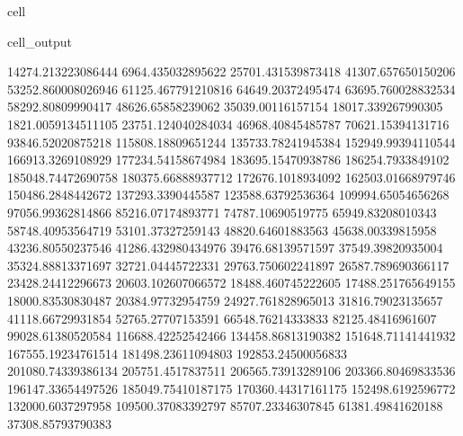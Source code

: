 \documentclass[letterpaper,10pt,english]{jupyterBook}
\begin{document}
\begin{sphinxuseclass}{cell}
\begin{sphinxVerbatimOutput}
\begin{sphinxuseclass}{cell_output}
\begin{sphinxVerbatim}[commandchars=\\\{\}]
14274.213223086444  \PYGZhy{}6964.435032895622  \PYGZhy{}25701.431539873418  \PYGZhy{}41307.657650150206  \PYGZhy{}53252.860008026946  \PYGZhy{}61125.467791210816  \PYGZhy{}64649.20372495474  \PYGZhy{}63695.760028832534  \PYGZhy{}58292.80809990417  \PYGZhy{}48626.65858239062  \PYGZhy{}35039.00116157154  \PYGZhy{}18017.339267990305  1821.0059134511105  23751.124040284034  46968.40845485787  70621.15394131716  93846.52020875218  115808.18809651244  135733.78241945384  152949.99394110544  166913.3269108929  177234.54158674984  183695.15470938786  186254.7933849102  185048.74472690758  180375.66888937712  172676.1018934092  162503.01668979746  150486.2848442672  137293.3390445587  123588.63792536364  109994.65054656268  97056.99362814866  85216.07174893771  74787.10690519775  65949.83208010343  58748.40953564719  53101.37327259143  48820.64601883563  45638.00339815958  43236.80550237546  41286.432980434976  39476.68139571597  37549.39820935004  35324.88813371697  32721.04445722331  29763.750602241897  26587.789690366117  23428.24412296673  20603.102607066572  18488.460745222605  17488.251765649155  18000.83530830487  20384.97732954759  24927.761828965013  31816.79023135657  41118.66729931854  52765.27707153591  66548.76214333833  82125.48416961607  99028.61380520584  116688.42252542466  134458.86813190382  151648.71141441932  167555.19234761514  181498.23611094803  192853.24500056833  201080.74339386134  205751.4517837511  206565.73913289106  203366.80469833536  196147.33654497526  185049.75410187175  170360.44317161175  152498.6192596772  132000.6037297958  109500.37083392797  85707.23346307845  61381.49841620188  37308.85793790383  

\end{sphinxVerbatim}
\end{sphinxuseclass}
\end{sphinxVerbatimOutput}
\end{sphinxuseclass}
\end{document}
